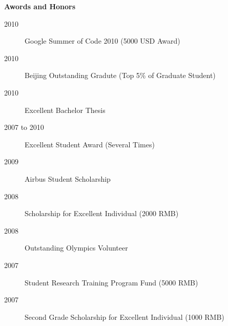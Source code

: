 \documentclass[letterpaper,11pt]{article}
\newcommand{\resheading}[1]{{\large \colorbox{mygrey}{\begin{minipage}{\textwidth}{\textbf{#1 \vphantom{p\^{E}}}}\end{minipage}}}}
\begin{document}
\resheading{{Awords and Honors}}
	\begin{description}
    \item[2010] {Google Summer of Code 2010 (5000 USD Award)}
    \item[2010] {Beijing Outstanding Gradute (Top 5\% of Graduate Student)}
	  \item[2010] {Excellent Bachelor Thesis}
    \item[2007 to 2010] {Excellent Student Award (Several Times)}
    \item[2009] {Airbus Student Scholarship}
    \item[2008] {Scholarship for Excellent Individual (2000 RMB)}
    \item[2008] {Outstanding Olympics Volunteer}
    \item[2007] {Student Research Training Program Fund (5000 RMB)}
    \item[2007] {Second Grade Scholarship for 
    Excellent Individual (1000 RMB)}
	
	\end{description}
\end{document}
